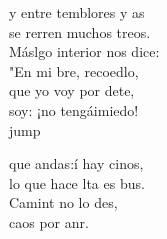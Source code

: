 \begin{cancion}
	y entre temblores y as \\
	se rerren muchos treos. \\
	Máslgo interior nos dice: \\
	"En mi bre, recoedlo,\\
	que yo voy por dete, \\
	 soy: ¡no tengáimiedo!\\jump\\
	\begin{chorus}%
	 que andas:í hay cinos,  \\
	lo que hace lta es bus.\\
	Camint no lo des,\\
	 caos por anr.\\
	\end{chorus}%
	\jump\\
\end{cancion}%
